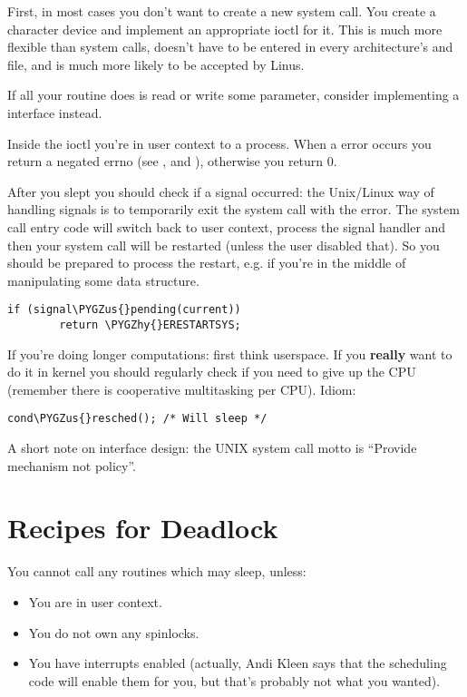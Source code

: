 \documentclass[a4paper,8pt,english]{sphinxmanual}
\def\PYGZus{\char`\_}
\def\PYGZhy{\char`\-}
\begin{document}
First, in most cases you don't want to create a new system call. You
create a character device and implement an appropriate ioctl for it.
This is much more flexible than system calls, doesn't have to be entered
in every architecture's  and
 file, and is much more likely to be accepted by
Linus.

If all your routine does is read or write some parameter, consider
implementing a  interface instead.

Inside the ioctl you're in user context to a process. When a error
occurs you return a negated errno (see
,
 and ),
otherwise you return 0.

After you slept you should check if a signal occurred: the Unix/Linux
way of handling signals is to temporarily exit the system call with the
 error. The system call entry code will switch back to
user context, process the signal handler and then your system call will
be restarted (unless the user disabled that). So you should be prepared
to process the restart, e.g. if you're in the middle of manipulating
some data structure.

\begin{Verbatim}[commandchars=\\\{\}]
if (signal\PYGZus{}pending(current))
        return \PYGZhy{}ERESTARTSYS;
\end{Verbatim}

If you're doing longer computations: first think userspace. If you
\textbf{really} want to do it in kernel you should regularly check if you need
to give up the CPU (remember there is cooperative multitasking per CPU).
Idiom:

\begin{Verbatim}[commandchars=\\\{\}]
cond\PYGZus{}resched(); /* Will sleep */
\end{Verbatim}

A short note on interface design: the UNIX system call motto is ``Provide
mechanism not policy''.


\section{Recipes for Deadlock}
\label{kernel-hacking/hacking:recipes-for-deadlock}
You cannot call any routines which may sleep, unless:
\begin{itemize}
\item {} 
You are in user context.

\item {} 
You do not own any spinlocks.

\item {} 
You have interrupts enabled (actually, Andi Kleen says that the
scheduling code will enable them for you, but that's probably not
what you wanted).

\end{itemize}
\end{document}
